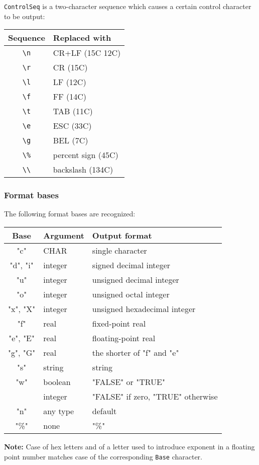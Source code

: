 {\samepage
\verb'ControlSeq' is a two-character sequence which causes
a certain control character to be output:

\begin{tabular}{c|l}
\bf Sequence & \bf Replaced with \\
\hline
\verb'\n' & CR+LF (15C 12C)    \\
\verb'\r' & CR  (15C)          \\
\verb'\l' & LF  (12C)          \\
\verb'\f' & FF  (14C)          \\
\verb'\t' & TAB (11C)          \\
\verb'\e' & ESC (33C)          \\
\verb'\g' & BEL (7C)           \\
\verb'\%' & percent sign (45C) \\
\verb'\\' & backslash (134C)
\end{tabular}
} %

\subsubsection{Format bases}

{\samepage
The following format bases are recognized:

\begin{tabular}{c|l|l}
\bf Base & \bf Argument & \bf Output format           \\
\hline
   "c"   & CHAR    & single character                  \\
"d", "i" & integer & signed decimal integer            \\
   "u"   & integer & unsigned decimal integer          \\
   "o"   & integer & unsigned octal integer            \\
"x", "X" & integer & unsigned hexadecimal integer      \\
   "f"   & real    & fixed-point real                  \\
"e", "E" & real    & floating-point real               \\
"g", "G" & real    & the shorter of "f" and "e"        \\
   "s"   & string  & string                            \\
   "w"   & boolean & "FALSE" or "TRUE"                 \\
         & integer & "FALSE" if zero, "TRUE" otherwise \\
   "n"   & any type & default \\
   "\%"   & none & "\%"
\end{tabular}

{\footnotesize
{\bf Note:} Case of hex letters and of a letter used to introduce exponent
in a floating point number matches case of the corresponding
\verb'Base' character.

} %
} %

